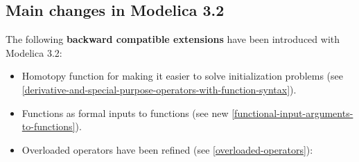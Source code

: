 \documentclass[../MLS.tex]{subfiles}
\begin{document}
\subsection{Main changes in Modelica 3.2}

The following \textbf{backward compatible extensions} have been
introduced with Modelica 3.2:

\begin{itemize}
\item
  Homotopy function for making it easier to solve initialization
  problems (see \autoref{derivative-and-special-purpose-operators-with-function-syntax}).
\item
  Functions as formal inputs to functions (see new \autoref{functional-input-arguments-to-functions}).
\item
  Overloaded operators have been refined (see \autoref{overloaded-operators}):


\end{itemize}
\end{document}
